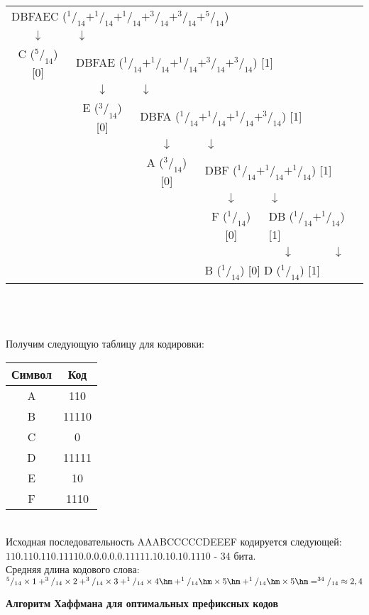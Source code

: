 \begin{table}[h]
\centering
\begin{tabular}{c c c c c c}
\multicolumn{6}{l}{DBFAEC ($^1/_{14} + ^1/_{14} + ^1/_{14} + ^3/_{14} + ^3/_{14} + ^5/_{14}$)} \\
$\downarrow$ & \multicolumn{5}{l}{$\downarrow$} \\
C ($^5/_{14}$) [0] & \multicolumn{5}{l}{DBFAE ($^1/_{14} + ^1/_{14} + ^1/_{14} + ^3/_{14} + ^3/_{14}$) [1]} \\
& $\downarrow$ & \multicolumn{4}{l}{$\downarrow$} \\
& E ($^3/_{14}$) [0] & \multicolumn{4}{l}{DBFA ($^1/_{14} + ^1/_{14} + ^1/_{14} + ^3/_{14}$) [1]} \\
& & $\downarrow$ & \multicolumn{3}{l}{$\downarrow$} \\
& & A ($^3/_{14}$) [0] & \multicolumn{3}{l}{DBF ($^1/_{14} + ^1/_{14} + ^1/_{14}$) [1]} \\
& & & $\downarrow$ & \multicolumn{2}{l}{$\downarrow$} \\
& & & F ($^1/_{14}$) [0] & \multicolumn{2}{l}{DB ($^1/_{14} + ^1/_{14}$) [1]} \\
& & & & $\downarrow$ & \multicolumn{1}{c}{$\downarrow$} \\
& & & \multicolumn{3}{l}{\qquad B ($^1/_{14}$) [0] \qquad D ($^1/_{14}$) [1]}\\
\end{tabular}
\end{table}
\\
\\
\\Получим следующую таблицу для кодировки:
\\
\begin{table}[h]
\begin{tabular}{|c|c|}
\hline
Символ &  Код \\
\hline
A & 110 \\
B & 11110 \\
C & 0 \\
D & 11111 \\
E & 10 \\
F & 1110 \\
\hline
\end{tabular}
\end{table}
\\Исходная последовательность AAABCCCCCDEEEF кодируется следующей: $110.110.110.11110.0.0.0.0.0.11111.10.10.10.1110$ - 34 бита.
\\Средняя длина кодового слова: $^5/_{14}\times 1 + ^3/_{14}\times 2 + ^3/_{14}\times 3 + ^1/_{14}\times 4\hm + ^1/_{14}\hm\times 5\hm + ^1/_{14}\hm\times 5\hm = ^{34}/_{14} \approx 2,4$
\begin{center}
  \textbf{Алгоритм Хаффмана для оптимальных префиксных кодов}
\end{center}

